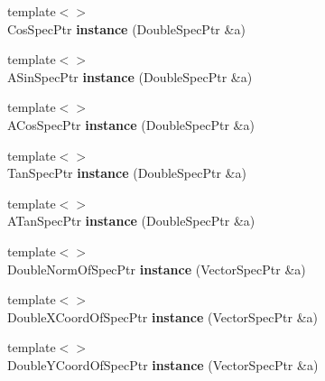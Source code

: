 \begin{DoxyCompactItemize}
\item 
\hypertarget{namespacegiskard__suturo_a328806b2418edfe553b28c8eb07c596a}{{\footnotesize template$<$$>$ }\\Cos\-Spec\-Ptr {\bfseries instance} (Double\-Spec\-Ptr \&a)}\label{namespacegiskard__suturo_a328806b2418edfe553b28c8eb07c596a}

\item 
\hypertarget{namespacegiskard__suturo_ad08242d3c4edfebf975d9739f4de7336}{{\footnotesize template$<$$>$ }\\A\-Sin\-Spec\-Ptr {\bfseries instance} (Double\-Spec\-Ptr \&a)}\label{namespacegiskard__suturo_ad08242d3c4edfebf975d9739f4de7336}

\item 
\hypertarget{namespacegiskard__suturo_a767fb798ce5d714192e357feeeb7437a}{{\footnotesize template$<$$>$ }\\A\-Cos\-Spec\-Ptr {\bfseries instance} (Double\-Spec\-Ptr \&a)}\label{namespacegiskard__suturo_a767fb798ce5d714192e357feeeb7437a}

\item 
\hypertarget{namespacegiskard__suturo_ab6900f3af8c83ee634ee4980174a1168}{{\footnotesize template$<$$>$ }\\Tan\-Spec\-Ptr {\bfseries instance} (Double\-Spec\-Ptr \&a)}\label{namespacegiskard__suturo_ab6900f3af8c83ee634ee4980174a1168}

\item 
\hypertarget{namespacegiskard__suturo_a5b71f6a084d7805c3ac9224526fb3074}{{\footnotesize template$<$$>$ }\\A\-Tan\-Spec\-Ptr {\bfseries instance} (Double\-Spec\-Ptr \&a)}\label{namespacegiskard__suturo_a5b71f6a084d7805c3ac9224526fb3074}

\item 
\hypertarget{namespacegiskard__suturo_a8484920f5d1db7bc4c7a3b439a309ca8}{{\footnotesize template$<$$>$ }\\Double\-Norm\-Of\-Spec\-Ptr {\bfseries instance} (Vector\-Spec\-Ptr \&a)}\label{namespacegiskard__suturo_a8484920f5d1db7bc4c7a3b439a309ca8}

\item 
\hypertarget{namespacegiskard__suturo_afd41d2bc6929f42af404393116d51c4d}{{\footnotesize template$<$$>$ }\\Double\-X\-Coord\-Of\-Spec\-Ptr {\bfseries instance} (Vector\-Spec\-Ptr \&a)}\label{namespacegiskard__suturo_afd41d2bc6929f42af404393116d51c4d}

\item 
\hypertarget{namespacegiskard__suturo_a29d9d4372d50d01299bd92216e8a102b}{{\footnotesize template$<$$>$ }\\Double\-Y\-Coord\-Of\-Spec\-Ptr {\bfseries instance} (Vector\-Spec\-Ptr \&a)}\label{namespacegiskard__suturo_a29d9d4372d50d01299bd92216e8a102b}


\end{DoxyCompactItemize}
